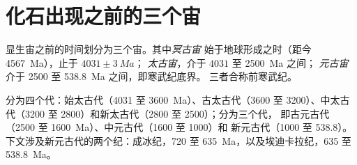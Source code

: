 \section{化石出现之前的三个宙}\label{sec:b2:precambrian-earth:eons}

\begin{definition}\label{def:b2:precambrian-earth:eons}
显生宙之前的时间划分为三个宙。其中\emph{冥古宙}
始于地球形成之时（距今 \qty{4567}{Ma}），止于 $4031 \pm \qty{3}{Ma}$；
\emph{太古宙}，介于 $4031$ 至 \qty{2500}{Ma} 之间；
\emph{元古宙}介于 2500 至 \qty{538.8}{Ma} 之间，即寒武纪底界。
三者合称前寒武纪。
\end{definition}

分为四个代：始太古代（4031 至 \qty{3600}{Ma}）、古太古代（3600
至 3200）、中太古代（3200 至 2800）和新太古代（2800 至 2500）；分为三个代，
即古元古代（2500 至 \qty{1600}{Ma}）、中元古代（1600 至 1000）和
新元古代（1000 至 538.8）。下文涉及新元古代的两个纪：成冰纪，720 至
\qty{635}{Ma}，以及埃迪卡拉纪，635 至 \qty{538.8}{Ma}。

